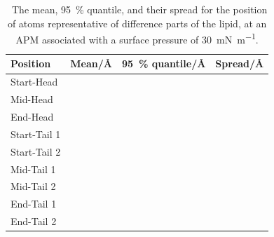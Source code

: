 \documentclass[amsmath,amssymb,twocolumn,superscriptaddress]{revtex4-1}
\begin{document}
\begin{table}[h]
\small
  \caption{\ The mean, \SI{95}{\percent} quantile, and their spread for the position of atoms representative of difference parts of the lipid, at an APM associated with a surface pressure of \SI{30}{\milli\newton\per\meter}.}
  \label{tab:spread}
  \begin{tabular*}{0.48\textwidth}{@{\extracolsep{\fill}}llll}
    \hline
    Position & Mean/\si{\angstrom} & \SI{95}{\percent} quantile/\si{\angstrom} & Spread/\si{\angstrom} \\
    \hline
    Start-Head &  &  &  \\
    Mid-Head &  &  &  \\
    End-Head &  &  &  \\
    \hline
    Start-Tail 1 &  &  &  \\
    Start-Tail 2 &  &  &  \\
    Mid-Tail 1 &  &  &  \\
    Mid-Tail 2 &  &  &  \\
    End-Tail 1 &  &  &  \\
    End-Tail 2 &  &  &  \\
    \hline
  \end{tabular*}
\end{table}
%
\end{document}
